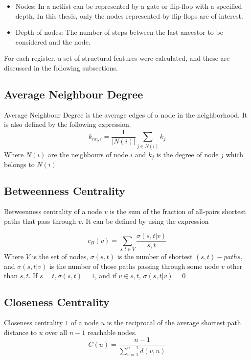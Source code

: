 \documentclass{tum-book}
\begin{document}
            \begin{itemize}
                \item Nodes: In a netlist can be represented by a gate or flip-flop with a specified depth. In this thesis, only the nodes represented by flip-flops are of interest.
                \item Depth of nodes: The number of steps between the last ancestor to be considered and the node. 
            \end{itemize}
    
        \bigskip\noindent
        For each register, a set of structural features were calculated, and these are discussed in the following subsections.
    
            \subsection{Average Neighbour Degree}
            Average Neighbour Degree is the average edges of a node in the neighborhood. It is also defined by the following expression.
                \begin{equation}
                k_{nn,i} = \frac{1}{|N(i)|} \sum_{j \in N(i)} k_j
                \end{equation}
            Where ${N(i)}$ are the neighbours of node $i$ and $k_j$ is the degree of node $j$ which belongs to $N(i)$
    
            \subsection{Betweenness Centrality}
            Betweenness centrality of a node $v$ is the sum of the fraction of all-pairs shortest paths that pass through $v$. It can be defined by using the expression
            
                \begin{equation}
                c_{B}(v) = \sum_{s,t \in V} \frac{\sigma(s,t |v)}{s,t}
                \end{equation}
                Where $V$ is the set of nodes, $\sigma(s, t)$ is the number of shortest $(s, t)-paths$, and $\sigma(s, t|v)$ is the number of those paths passing through some node $v$ other than $s, t$. If $s = t, \sigma(s, t) = 1$, and if $v \in {s, t}$, $\sigma(s, t|v) = 0$ 
    
            \subsection{Closeness Centrality}
            Closeness centrality $1$ of a node $u$ is the reciprocal of the average shortest path distance to $u$ over all $n-1$ reachable nodes.
                \begin{equation}
                C(u)=\frac{n-1}{\sum_{v=1}^{n-1} d(v,u)}
                \end{equation}
    
\end{document}
